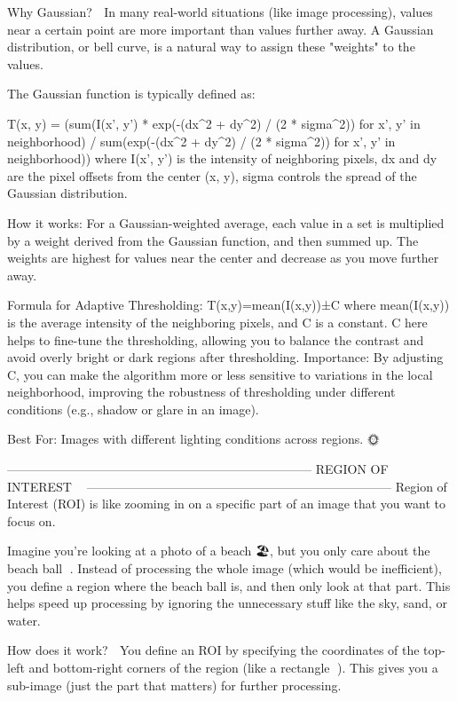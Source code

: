 Why Gaussian? 🧠
In many real-world situations (like image processing), values near a certain point are more important than values further away. A Gaussian distribution, or bell curve, is a natural way to assign these "weights" to the values.

The Gaussian function is typically defined as:

T(x, y) = (sum(I(x', y') * exp(-(dx^2 + dy^2) / (2 * sigma^2)) for x', y' in neighborhood) / sum(exp(-(dx^2 + dy^2) / (2 * sigma^2)) for x', y' in neighborhood))
where 
I(x', y') is the intensity of neighboring pixels,
dx and dy are the pixel offsets from the center (x, y),
sigma controls the spread of the Gaussian distribution.

How it works:
For a Gaussian-weighted average, each value in a set is multiplied by a weight derived from the Gaussian function, and then summed up. The weights are highest for values near the center and decrease as you move further away.

Formula for Adaptive Thresholding:
T(x,y)=mean(I(x,y))±C
where mean(I(x,y)) is the average intensity of the neighboring pixels, and C is a constant.
C here helps to fine-tune the thresholding, allowing you to balance the contrast and avoid overly bright or dark regions after thresholding.
Importance: By adjusting C, you can make the algorithm more or less sensitive to variations in the local neighborhood, improving the robustness of thresholding under different conditions (e.g., shadow or glare in an image).

Best For: Images with different lighting conditions across regions. 🌞

--------------------------------------------------------------------------
REGION OF INTEREST 📸👀
--------------------------------------------------------------------------
Region of Interest (ROI) is like zooming in on a specific part of an image that you want to focus on. 🌟

Imagine you’re looking at a photo of a beach 🏖️, but you only care about the beach ball 🎾. Instead of processing the whole image (which would be inefficient), you define a region where the beach ball is, and then only look at that part. This helps speed up processing by ignoring the unnecessary stuff like the sky, sand, or water.

How does it work? 🤔
You define an ROI by specifying the coordinates of the top-left and bottom-right corners of the region (like a rectangle 📏). This gives you a sub-image (just the part that matters) for further processing.

